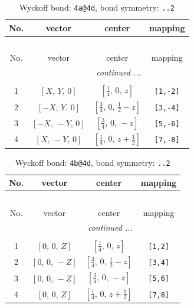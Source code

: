 \documentclass[fleqn,8pt]{jsarticle}
\begin{document}
\begin{longtable}{cccc}
\caption{Wyckoff bond: {\tt 4a@4d}, bond symmetry: {\tt ..2}}
 \\
 \hline \hline
No. & vector & center & mapping \\ \hline \endfirsthead

\multicolumn{3}{l}{\tablename\ \thetable{}} \\
 \hline \hline
No. & vector & center & mapping \\ \hline \endhead

 \hline \hline
\multicolumn{3}{r}{\footnotesize\it continued ...} \\ \endfoot

 \hline \hline
\multicolumn{3}{r}{} \\ \endlastfoot

1 & $\left[ X,\, Y,\, 0 \right]$ & $\left[ \frac{1}{4},\, 0,\, z \right]$ & {\tt [1,-2]} \\ \hline
2 & $\left[ - X,\, Y,\, 0 \right]$ & $\left[ \frac{3}{4},\, 0,\, \frac{1}{2} - z \right]$ & {\tt [3,-4]} \\ \hline
3 & $\left[ - X,\, - Y,\, 0 \right]$ & $\left[ \frac{3}{4},\, 0,\, - z \right]$ & {\tt [5,-6]} \\ \hline
4 & $\left[ X,\, - Y,\, 0 \right]$ & $\left[ \frac{1}{4},\, 0,\, z + \frac{1}{2} \right]$ & {\tt [7,-8]} \\
\end{longtable}
\renewcommand{\arraystretch}{1.2}
\begin{longtable}{cccc}
\caption{Wyckoff bond: {\tt 4b@4d}, bond symmetry: {\tt ..2}}
 \\
 \hline \hline
No. & vector & center & mapping \\ \hline \endfirsthead

\multicolumn{3}{l}{\tablename\ \thetable{}} \\
 \hline \hline
No. & vector & center & mapping \\ \hline \endhead

 \hline \hline
\multicolumn{3}{r}{\footnotesize\it continued ...} \\ \endfoot

 \hline \hline
\multicolumn{3}{r}{} \\ \endlastfoot

1 & $\left[ 0,\, 0,\, Z \right]$ & $\left[ \frac{1}{4},\, 0,\, z \right]$ & {\tt [1,2]} \\ \hline
2 & $\left[ 0,\, 0,\, - Z \right]$ & $\left[ \frac{3}{4},\, 0,\, \frac{1}{2} - z \right]$ & {\tt [3,4]} \\ \hline
3 & $\left[ 0,\, 0,\, - Z \right]$ & $\left[ \frac{3}{4},\, 0,\, - z \right]$ & {\tt [5,6]} \\ \hline
4 & $\left[ 0,\, 0,\, Z \right]$ & $\left[ \frac{1}{4},\, 0,\, z + \frac{1}{2} \right]$ & {\tt [7,8]} \\
\end{longtable}
\end{document}
